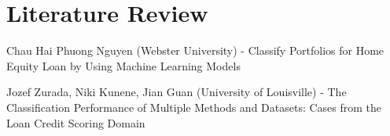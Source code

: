 \chapter{Literature Review}
\label{chap:three}

Chau Hai Phuong Nguyen (Webster University) - Classify Portfolios for Home Equity Loan by Using Machine Learning Models

Jozef Zurada, Niki Kunene, Jian Guan (University of Louisville) - The Classification Performance of Multiple Methods and
Datasets: Cases from the Loan Credit Scoring Domain